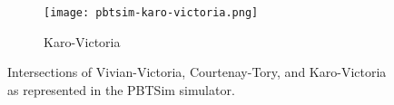 \begin{appendices}
\begin{figure}[]
\vspace{1cm}

\begin{subfigure}{.5\textwidth}
  \centering
  \texttt{[image: pbtsim-karo-victoria.png]}
  \caption{Karo-Victoria}
  \label{fig:sub1}
\end{subfigure}%
\caption[Screenshows of the Vivian-Victoria, Courtenay-Tory, and Karo-Victoria intersections as represented in the PBTSim simulator.]{ Intersections of Vivian-Victoria, Courtenay-Tory, and Karo-Victoria as represented in the PBTSim simulator.  }
\label{pbtsim_intersections}
\end{figure}

\end{appendices}
